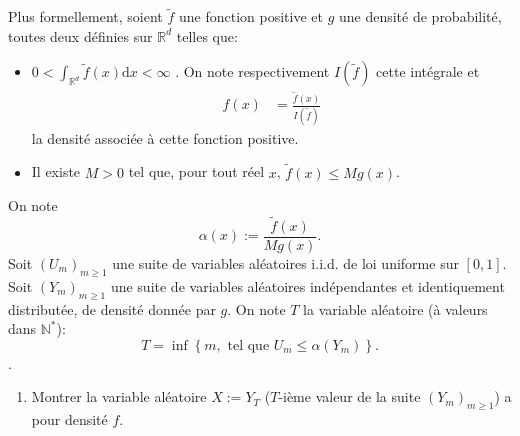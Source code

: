 \documentclass[
]{article}
\providecommand{\tightlist}{%
  \setlength{\itemsep}{0pt}\setlength{\parskip}{0pt}}
\begin{document}
Plus formellement, soient \(\tilde{f}\) une fonction positive et \(g\)
une densité de probabilité, toutes deux définies sur \(\mathbb{R}^d\)
telles que:

\begin{itemize}
\tightlist
\item
  \(0 < \int_{\mathbb{R}^d}\tilde{f}(x)\text{d}x < \infty\) . On note
  respectivement \(I(\tilde{f})\) cette intégrale et \begin{align*}
  f(x) &= \frac{\tilde{f}(x)}{I(\tilde{f})}
  \end{align*} la densité associée à cette fonction positive.
\item
  Il existe \(M>0\) tel que, pour tout réel \(x\),
  \(\tilde{f}(x) \leq M g(x)\).
\end{itemize}

On note \[\alpha(x) := \frac{\tilde{f}(x)}{Mg(x)}.\] Soit
\((U_m)_{m\geq 1}\) une suite de variables aléatoires i.i.d. de loi
uniforme sur \([0, 1]\). Soit \((Y_m)_{m\geq 1}\) une suite de variables
aléatoires indépendantes et identiquement distributée, de densité donnée
par \(g\). On note \(T\) la variable aléatoire (à valeurs dans
\(\mathbb{N}^*\)):
\[T = \inf\left\lbrace m, \text{ tel que } U_m \leq \alpha(Y_m)\right\rbrace.\].

\begin{enumerate}
\def\labelenumi{\arabic{enumi}.}
\tightlist
\item
  Montrer la variable aléatoire \(X := Y_T\) (\(T\)-ième valeur de la
  suite \((Y_m)_{m\geq 1}\)) a pour densité \(f\).
\end{enumerate}
\end{document}
